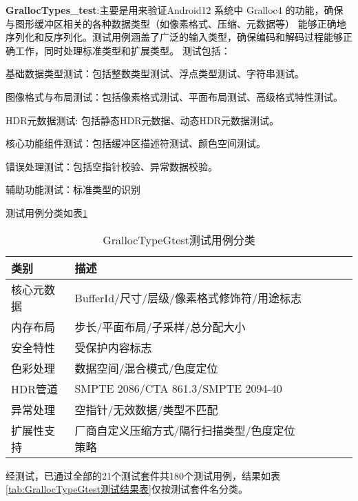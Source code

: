 \textbf{GrallocTypes\_test}:主要是用来验证Android12 系统中 Gralloc4 的功能，确保与图形缓冲区相关的各种数据类型（如像素格式、压缩、元数据等）
能够正确地序列化和反序列化。测试用例涵盖了广泛的输入类型，确保编码和解码过程能够正确工作，同时处理标准类型和扩展类型。
测试包括：

    基础数据类型测试：包括整数类型测试、浮点类型测试、字符串测试。

    图像格式与布局测试：包括像素格式测试、平面布局测试、高级格式特性测试。

    HDR元数据测试: 包括静态HDR元数据、动态HDR元数据测试。

    核心功能组件测试：包括缓冲区描述符测试、颜色空间测试。

    错误处理测试：包括空指针校验、异常数据校验。
    
    辅助功能测试：标准类型的识别

测试用例分类如表\ref{tab:GrallocTypeGtest测试用例分类}

\begin{table}[H]
    \centering
    \caption{GrallocTypeGtest测试用例分类}
    \label{tab:GrallocTypeGtest测试用例分类}
    \begin{tabular}{llllll}
      \toprule
      类别 & 描述  \\
      \midrule
      核心元数据 & BufferId/尺寸/层级/像素格式修饰符/用途标志  \\
      内存布局 & 步长/平面布局/子采样/总分配大小 \\
      安全特性 & 受保护内容标志 \\
      色彩处理 & 数据空间/混合模式/色度定位 \\
      HDR管道 & SMPTE 2086/CTA 861.3/SMPTE 2094-40 \\
      异常处理 & 空指针/无效数据/类型不匹配 \\
      扩展性支持 & 厂商自定义压缩方式/隔行扫描类型/色度定位策略 \\
      \bottomrule
    \end{tabular}
    \note{}
\end{table}

经测试，已通过全部的21个测试套件共180个测试用例，结果如表\ref{tab:GrallocTypeGtest测试结果表}仅按测试套件名分类。

